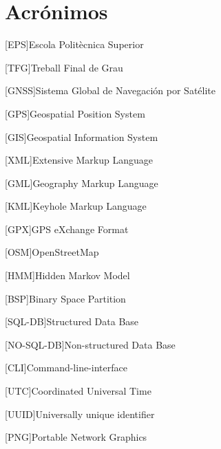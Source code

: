 \chapter{Acrónimos} %
%
%
\begin{acronym}

[EPS]{Escola Politècnica Superior}

[TFG]{Treball Final de Grau}

[GNSS]{Sistema Global de Navegación por Satélite}

[GPS]{Geospatial Position System}

[GIS]{Geospatial Information System}

[XML]{Extensive Markup Language}

[GML]{Geography Markup Language}

[KML]{Keyhole Markup Language}

[GPX]{GPS eXchange Format}

[OSM]{OpenStreetMap}

[HMM]{Hidden Markov Model}

[BSP]{Binary Space Partition}

[SQL-DB]{Structured Data Base}

[NO-SQL-DB]{Non-structured Data Base}

[CLI]{Command-line-interface}

[UTC]{Coordinated Universal Time}

[UUID]{Universally unique identifier}

[PNG]{Portable Network Graphics}

\end{acronym}
